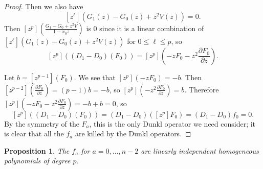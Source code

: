 \documentclass{article}
\numberwithin{equation}{section}
\newtheorem{proposition}[equation]{Proposition}
\begin{document}
\begin{proof}
Then we also have
 $$[z^\ell](G_1(z)-G_0(z)+z^2V(z))=0.$$ Then $[z^p]\left(\frac{G_1-G_0+z^2V}{1-x_0z}\right)$ is $0$ since it is a linear combination of $[z^\ell](G_1(z)-G_0(z)+z^2V(z))$ for $0 \le \ell \le p$, so $$[z^p]\left((D_1-D_0)(F_0)\right)=[z^p]\left(-zF_0-z^2\frac{\partial F_0}{\partial z}\right).$$

Let $b=[z^{p-1}](F_0)$. We see that $[z^p](-zF_0)=-b$. Then $[z^{p-2}]\left(\frac{\partial F_0}{\partial z}\right)=(p-1)b=-b$, so $[z^p]\left(-z^2\frac{\partial F_0}{\partial z}\right)=b$. Therefore $[z^p]\left(-zF_0-z^2\frac{\partial F_0}{\partial z}\right)=-b+b=0$, so $$[z^p]((D_1-D_0)(F_0))=(D_1-D_0)([z^p]F_0)=(D_1-D_0)f_0=0.$$ By the symmetry of the $F_a$, this is the only Dunkl operator we need consider; it is clear that all the $f_a$ are killed by the Dunkl operators.
\end{proof}

\begin{proposition}\label{prop:linind} The $f_a$ for $a=0,\dots,n-2$ are linearly independent homogeneous polynomials of degree $p$.
\end{proposition} 
\end{document}
